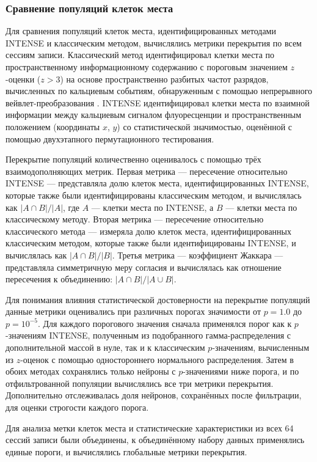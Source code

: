 \subsubsection{Сравнение популяций клеток места}
\label{sec:comparison_pc_populations}
Для сравнения популяций клеток места, идентифицированных методами INTENSE и классическим методом,
вычислялись метрики перекрытия по всем сессиям записи. Классический метод
идентифицировал клетки места по пространственному информационному содержанию с пороговым значением $z$-оценки
($z>3$) на основе пространственно разбитых частот разрядов, вычисленных по кальциевым событиям, обнаруженным с помощью
непрерывного вейвлет-преобразования \cite{Neugornet2021}. INTENSE идентифицировал
клетки места по взаимной информации между кальциевым сигналом флуоресценции и
пространственным положением (координаты $x$, $y$) со статистической значимостью, оценённой с помощью
двухэтапного пермутационного тестирования.

Перекрытие популяций количественно оценивалось с помощью трёх взаимодополняющих метрик. Первая
метрика --- пересечение относительно INTENSE --- представляла долю клеток места, идентифицированных INTENSE,
которые также были идентифицированы классическим методом, и вычислялась как $|A \cap B| /
|A|$, где $A$ --- клетки места по INTENSE, а $B$ --- клетки места по классическому методу. Вторая метрика --- пересечение относительно классического метода --- измеряла долю клеток места, идентифицированных
классическим методом, которые также были идентифицированы INTENSE, и вычислялась как $|A
\cap B| / |B|$. Третья метрика --- коэффициент Жаккара --- представляла симметричную
меру согласия и вычислялась как отношение пересечения к объединению: $|A \cap B| /
|A \cup B|$.

Для понимания влияния статистической достоверности на перекрытие популяций данные метрики оценивались
при различных порогах значимости от $p = 1.0$ до $p =
10^{-5}$. Для каждого порогового значения сначала применялся порог как к $p$-значениям INTENSE,
полученным из подобранного гамма-распределения с дополнительной массой в нуле, так и к классическим $p$-значениям, вычисленным
из $z$-оценок с помощью одностороннего нормального распределения. Затем в обоих методах сохранялись только нейроны с $p$-значениями ниже порога, и по отфильтрованной популяции вычислялись все три метрики
перекрытия. Дополнительно отслеживалась доля нейронов, сохранённых после фильтрации, для оценки строгости каждого порога.

Для анализа метки клеток места и статистические характеристики из всех 64
сессий записи были объединены, к объединённому набору данных применялись единые пороги, и
вычислялись глобальные метрики перекрытия.

